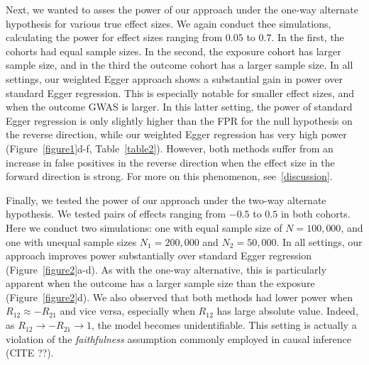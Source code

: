 \documentclass{article}
\begin{document}
Next, we wanted to asses the power of our approach under the one-way alternate
hypothesis for various true effect sizes. We again conduct thee simulations,
calculating the power for effect sizes ranging from $0.05$ to $0.7$.
In the first, the cohorts had equal sample sizes. In the second, the exposure
cohort has larger sample size, and in the third the outcome cohort
has a larger sample size. In all settings, our weighted Egger approach shows
a substantial gain in power over standard Egger regression. This is especially
notable for smaller effect sizes, and when the outcome GWAS is larger.
In this latter setting, the power of standard Egger regression is only slightly
higher than the FPR for the null hypothesis on the reverse direction,
while our weighted Egger regression has very high power
(Figure~\ref{figure1}d-f, Table~\ref{table2}). However, both
methods suffer from an increase in false positives in the reverse direction
when the effect size in the forward direction is strong. For more on this
phenomenon, see~\ref{discussion}.

Finally, we tested the power of our approach under the two-way alternate
hypothesis. We tested pairs of effects ranging from $-0.5$ to $0.5$ in both cohorts.
Here we conduct two simulations: one with equal sample size of $N=100,000$,
and one with unequal sample sizes $N_1 = 200,000$ and $N_2 = 50,000$.
In all settings, our approach improves power
substantially over standard Egger regression (Figure~\ref{figure2}a-d). As with
the one-way alternative, this is particularly apparent when the outcome has a larger
sample size than the exposure (Figure~\ref{figure2}d). We also observed that both
methods had lower power when $R_{12} \approx -R_{21}$ and vice versa, especially when
$R_{12}$ has large absolute value. Indeed, as $R_{12} \rightarrow -R_{21} \rightarrow 1$, the model
becomes unidentifiable. This setting is actually a violation of the \emph{faithfulness}
assumption commonly employed in causal inference (CITE ??). 

\end{document}
